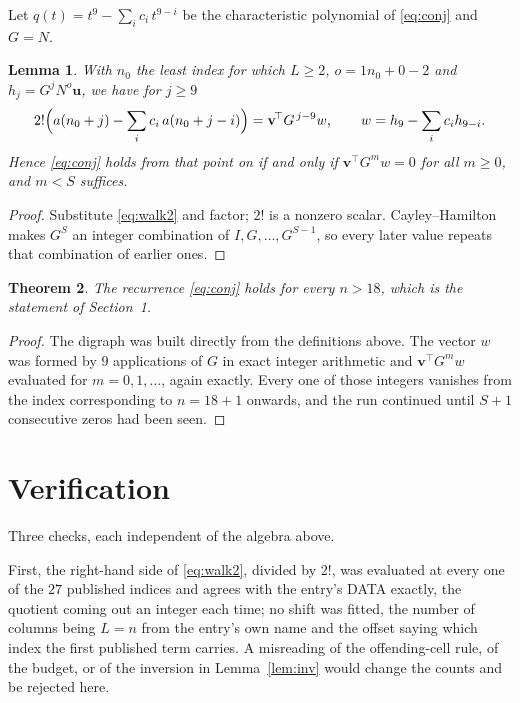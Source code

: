 \documentclass[11pt,a4paper]{article}
\theoremstyle{plain}
\newtheorem{theorem}{Theorem}
\newtheorem{lemma}[theorem]{Lemma}
\theoremstyle{definition}
\begin{document}
Let $q(t)=t^{9}-\sum_i c_i\,t^{9-i}$ be the characteristic polynomial of
\eqref{eq:conj} and $G=N$.

\begin{lemma}\label{lem:crit}
With $n_0$ the least index for which $L\ge2$, $o=1n_0+0-2$ and
$h_j=G^{j}N^{o}\mathbf{u}$, we have for $j\ge9$
\[
2!\Bigl(a(n_0+j)-\sum_i c_i\,a(n_0+j-i)\Bigr)=\mathbf{v}^{\!\top}G^{\,j-9}w,
\qquad w=h_{9}-\sum_i c_i h_{9-i} .
\]
Hence \eqref{eq:conj} holds from that point on if and only if
$\mathbf{v}^{\!\top}G^{m}w=0$ for all $m\ge0$, and $m<S$ suffices.
\end{lemma}

\begin{proof}
Substitute \eqref{eq:walk2} and factor; $2!$ is a nonzero scalar. Cayley--Hamilton
makes $G^{S}$ an integer combination of $I,G,\dots,G^{S-1}$, so every later value repeats
that combination of earlier ones.
\end{proof}

\begin{theorem}
The recurrence \eqref{eq:conj} holds for every $n>18$, which is the statement of
Section~1.
\end{theorem}

\begin{proof}
The digraph was built directly from the definitions above. The vector $w$ was formed by
$9$ applications of $G$ in exact integer arithmetic and $\mathbf{v}^{\!\top}G^{m}w$
evaluated for $m=0,1,\dots$, again exactly. Every one of those integers vanishes from the
index corresponding to $n=18+1$ onwards, and the run continued until $S+1$ consecutive
zeros had been seen.
\end{proof}

\section{Verification}

Three checks, each independent of the algebra above.

First, the right-hand side of \eqref{eq:walk2}, divided by $2!$, was evaluated at every
one of the $27$ published indices and agrees with the entry's DATA exactly, the quotient
coming out an integer each time; no shift was fitted, the number of columns being
$L=n$ from the entry's own name and the offset saying which index the first published
term carries. A misreading of the offending-cell rule, of the budget, or of the inversion in
Lemma~\ref{lem:inv} would change the counts and be rejected here.
\end{document}
